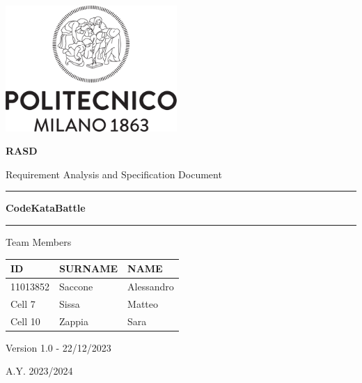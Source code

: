 \documentclass[12pt,a4paper]{article}
\begin{document}
\begin{titlepage}
    \centering
    \includegraphics[width=6.5cm]{RASD/Logo_Politecnico_Milano.png} \par
    \vspace*{1cm}
    {\LARGE \textbf{RASD}}\par
    \vspace*{0.5cm}
    {\Large Requirement Analysis and Specification Document}\par
    \vspace*{1cm}
    \rule{\linewidth}{0.3mm}\par
    \vspace*{2cm}
    {\LARGE \textbf{CodeKataBattle}}\par
    \vspace*{1.5cm}
    \rule{\linewidth}{0.3mm}\par
    \vspace*{1cm}
    \large Team Members\par
    \begin{table}[h]
      \centering
      \setlength{\arrayrulewidth}{1.3pt} 
      \renewcommand{\arraystretch}{2} 
      \begin{tabular}{|m{5cm}|m{5cm}|m{5cm}|}
        \hline
        \textbf{ID} & \textbf{SURNAME} & \textbf{NAME} \\
        \hline
        11013852 & Saccone & Alessandro \\
        \hline
        Cell 7 & Sissa & Matteo \\
        \hline
        Cell 10 & Zappia & Sara\\
        \hline
      \end{tabular}
    \end{table}
    \vspace*{0.5cm}
    {\large Version 1.0 - 22/12/2023}\par
    \vspace*{0.5cm}
    {\large A.Y. 2023/2024}\par
\end{titlepage}
\end{document}
